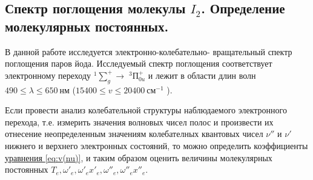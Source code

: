 \documentclass{article}
\begin{document}
\subsection{Спектр поглощения молекулы $I_2$. Определение молекулярных постоянных.}

В данной работе исследуется электронно-колебательно- вращательный спектр поглощения паров йода. Исследуемый спектр
поглощения соответствует электронному переходу $^1\sum^+_g~ $→ $~^3П^+_{0u}$  и лежит в области длин волн $490 \leqslant \lambda \leqslant 650~ нм$ ($15400 \leqslant v \leqslant 20400 ~см^{−1}$ ).

Если провести анализ колебательной структуры наблюдаемого электронного перехода, т.е. измерить значения волновых чисел полос и произвести их отнесение неопределенным значениям колебателных квантовых чисел $\nu''$  и $\nu'$  нижнего и верхнего электронных состояний, то можно определить коэффициенты \hyperref[eq:v(nu)]{уравнения \ref*{eq:v(nu)}}, и таким образом оценить величины молекулярных постоянных
$T_e, \omega'_e, \omega'_e x'_e, \omega''_e, \omega''_e x''_e$.
\end{document}
